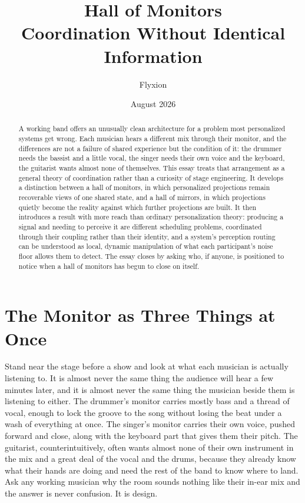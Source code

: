 \documentclass[12pt]{article}
\title{\textbf{Hall of Monitors}\\
\large Coordination Without Identical Information}
\author{Flyxion}
\date{August 2026}
\begin{document}
\maketitle

\begin{abstract}
A working band offers an unusually clean architecture for a problem most personalized systems get wrong. Each musician hears a different mix through their monitor, and the differences are not a failure of shared experience but the condition of it: the drummer needs the bassist and a little vocal, the singer needs their own voice and the keyboard, the guitarist wants almost none of themselves. This essay treats that arrangement as a general theory of coordination rather than a curiosity of stage engineering. It develops a distinction between a hall of monitors, in which personalized projections remain recoverable views of one shared state, and a hall of mirrors, in which projections quietly become the reality against which further projections are built. It then introduces a result with more reach than ordinary personalization theory: producing a signal and needing to perceive it are different scheduling problems, coordinated through their coupling rather than their identity, and a system's perception routing can be understood as local, dynamic manipulation of what each participant's noise floor allows them to detect. The essay closes by asking who, if anyone, is positioned to notice when a hall of monitors has begun to close on itself.
\end{abstract}

\newpage

\section{The Monitor as Three Things at Once}

Stand near the stage before a show and look at what each musician is actually listening to. It is almost never the same thing the audience will hear a few minutes later, and it is almost never the same thing the musician beside them is listening to either. The drummer's monitor carries mostly bass and a thread of vocal, enough to lock the groove to the song without losing the beat under a wash of everything at once. The singer's monitor carries their own voice, pushed forward and close, along with the keyboard part that gives them their pitch. The guitarist, counterintuitively, often wants almost none of their own instrument in the mix and a great deal of the vocal and the drums, because they already know what their hands are doing and need the rest of the band to know where to land. Ask any working musician why the room sounds nothing like their in-ear mix and the answer is never confusion. It is design.
\end{document}
